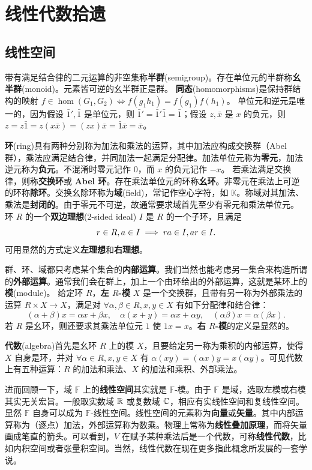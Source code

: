 \chapter{线性代数拾遗}\label{appx:LA}

\section{线性空间}

带有满足结合律的二元运算的非空集称\textbf{半群}(semigroup)。存在单位元的半群称\textbf{幺半群}(monoid)。元素皆可逆的幺半群正是群。
\textbf{同态}(homomorphisms)是保持群结构的映射 $f \in \hom(G_1, G_2 ) \Leftrightarrow f (g_1 h_1 )=f (g_1 ) f (h_1 )$。
单位元和逆元是唯一的，因为假设 $\bar 1',\bar 1$ 是单位元，则 $\bar 1'=\bar 1'\bar 1=\bar 1$；假设 $z,\bar x$ 是 $x$ 的负元，则 $z=z\bar 1=z(x\bar x)=(zx)\bar x=\bar 1\bar x=\bar x$。

\textbf{环}(ring)具有两种分别称为加法和乘法的运算，其中加法应构成交换群（Abel 群），乘法应满足结合律，并同加法一起满足分配律。加法单位元称为\textbf{零元}，加法逆元称为\textbf{负元}。不混淆时零元记作 $0$，而 $x$ 的负元记作 $-x$。
若乘法满足交换律，则称\textbf{交换环}或 \textbf{Abel 环}。存在乘法单位元的环称\textbf{幺环}。非零元在乘法上可逆的环称\textbf{除环}。交换幺除环称为\textbf{域}(field)，常记作空心字符，如 $\mathbb{K}$。称域对其加法、乘法是\textbf{封闭的}。由于零元不可逆，故通常要求域首先至少有零元和乘法单位元。
环 $R$ 的一个\textbf{双边理想}(2-sided ideal) $I$ 是 $R$ 的一个子环，且满足 
\[r \in R, a \in I \implies r a \in I, a r \in I.\]
可用显然的方式定义\textbf{左理想}和\textbf{右理想}。

群、环、域都只考虑某个集合的\textbf{内部运算}。我们当然也能考虑另一集合来构造所谓的\textbf{外部运算}。通常我们会在群上，加上一个由环给出的外部运算，这就是某环上的\textbf{模}(module)。
给定环 $R$，\textbf{左 $R$-模} $X$ 是一个交换群，且带有另一称为外部乘法的运算 $R \times X \rightarrow X$，满足对 $\forall \alpha,\beta \in R, x,y \in X$ 有如下分配律和结合律：
\[(\alpha+\beta) x=\alpha x+\beta x,\quad \alpha(x+y)=\alpha x+\alpha y,\quad (\alpha\beta)x=\alpha(\beta x).\]
若 $R$ 是幺环，则还要求其乘法单位元 $1$ 使 $1x=x$。\textbf{右 $R$-模}的定义是显然的。

\textbf{代数}(algebra)首先是幺环 $R$ 上的模 $X$，且要给定另一称为乘积的内部运算，使得 $X$ 自身是环，并对 $\forall \alpha \in R, x,y \in X$ 有 $\alpha(xy)=(\alpha x) y=x(\alpha y)$。可见代数上有五种运算：$R$ 的加法和乘法、$X$ 的加法和乘积、外部乘法。

进而回顾一下，域 $\mathbb F$ 上的\textbf{线性空间}其实就是 $\mathbb F$-模。由于 $\mathbb F$ 是域，选取左模或右模其实无关宏旨。一般取实数域 $\mathbb{R}$ 或复数域 $\mathbb{C}$，相应有实线性空间和复线性空间。显然 $\mathbb F$ 自身可以成为 $\mathbb F$-线性空间。线性空间的元素称为\textbf{向量}或\textbf{矢量}。其中内部运算称为（逐点）加法，外部运算称为数乘。物理上常称为\textbf{线性叠加原理}，而将矢量画成笔直的箭头。可以看到，$V$ 在赋予某种乘法后是一个代数，可称\textbf{线性代数}，比如内积空间或者张量积空间。当然，线性代数在现在更多指此概念所发展的一套学说。

